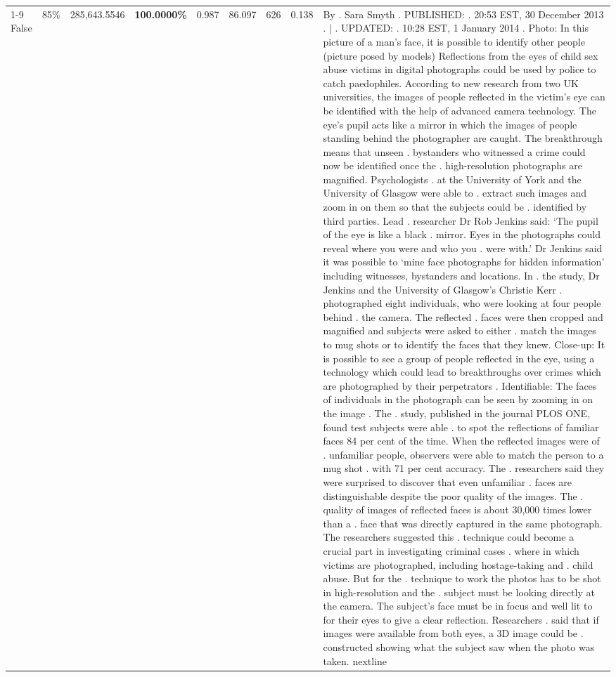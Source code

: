 \begin{table}[H]
\begin{tabular}{lllrlllll}
\cline{1-9} \cline{2-9}
False & 85\% & \color{red} 285,643.5546 & \bfseries \color{red} 100.0000\% & 0.987 & 86.097 & 626 & 0.138 & By . Sara Smyth . PUBLISHED: . 20:53 EST, 30 December 2013 . | . UPDATED: . 10:28 EST, 1 January 2014 . Photo: In this picture of a man's face, it is possible to identify other people (picture posed by models) Reflections from the eyes of child sex abuse victims in digital photographs could be used by police to catch paedophiles. According to new research from two UK universities, the images of people reflected in the victim's eye can be identified with the help of advanced camera technology. The eye's pupil acts like a mirror in which the images of people standing behind the photographer are caught. The breakthrough means that unseen . bystanders who witnessed a crime could now be identified once the . high-resolution photographs are magnified. Psychologists . at the University of York and the University of Glasgow were able to . extract such images and zoom in on them so that the subjects could be . identified by third parties. Lead . researcher Dr Rob Jenkins said: ‘The pupil of the eye is like a black . mirror. Eyes in the photographs could reveal where you were and who you . were with.' Dr Jenkins said it was possible to ‘mine face photographs for hidden information' including witnesses, bystanders and locations. In . the study, Dr Jenkins and the University of Glasgow's Christie Kerr . photographed eight individuals, who were looking at four people behind . the camera. The reflected . faces were then cropped and magnified and subjects were asked to either . match the images to mug shots or to identify the faces that they knew. Close-up: It is possible to see a group of people reflected in the eye, using a technology which could lead to breakthroughs over crimes which are photographed by their perpetrators . Identifiable: The faces of individuals in the photograph can be seen by zooming in on the image . The . study, published in the journal PLOS ONE, found test subjects were able . to spot the reflections of familiar faces 84 per cent of the time. When the reflected images were of . unfamiliar people, observers were able to match the person to a mug shot . with 71 per cent accuracy. The . researchers said they were surprised to discover that even unfamiliar . faces are distinguishable despite the poor quality of the images. The . quality of images of reflected faces is about 30,000 times lower than a . face that was directly captured in the same photograph. The researchers suggested this . technique could become a crucial part in investigating criminal cases . where in which victims are photographed, including hostage-taking and . child abuse. But for the . technique to work the photos has to be shot in high-resolution and the . subject must be looking directly at the camera. The subject's face must be in focus and well lit to for their eyes to give a clear reflection. Researchers . said that if images were available from both eyes, a 3D image could be . constructed showing what the subject saw when the photo was taken. nextline \\

\end{tabular}
\end{table}
